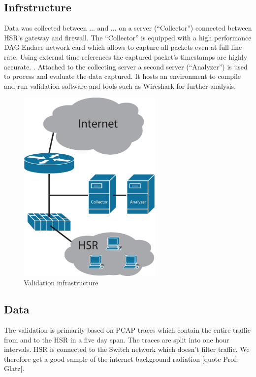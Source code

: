 \documentclass[a4paper]{scrartcl}
\begin{document}
\subsection{Infrstructure}
Data was collected between ... and ... on a server (``Collector'') connected between HSR's gateway and firewall.  The ``Collector'' is equipped with a high performance DAG Endace network card which allows to capture all packets even at full line rate. Using external time references the captured packet's timestamps are highly accurate. \cite{endace}. Attached to the collecting server a second server (``Analyzer'') is used to process and evaluate the data captured. It hosts an environment to compile and run validation software and tools such as Wireshark for further analysis.
\begin{figure}[ht]
	\begin{center}
		\includegraphics[width=200pt, keepaspectratio=true]{Bilder/Infrastruktur.eps}
		\caption{Validation infrastructure}
		\label{infra}
	\end{center}
\end{figure}

\subsection{Data}
The validation is primarily based on PCAP traces which contain the entire traffic from and to the HSR in a five day span. The traces are split into one hour intervals. HSR is connected to the Switch network which doesn't filter traffic. We therefore get a good sample of the internet background radiation [quote Prof. Glatz].
\end{document}
